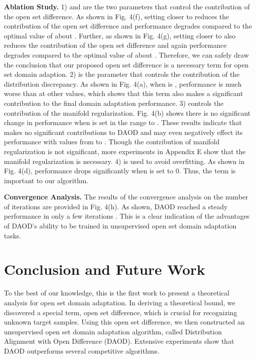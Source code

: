 \documentclass[journal]{IEEEtran}
\begin{document}
{\textbf{Ablation Study.} } 
1)  and  are the two parameters that control the contribution of the open set difference. As shown in Fig. 4(f), setting  closer to  reduces the contribution of the open set difference and performance degrades compared to the optimal value of about . Further, as shown in Fig. 4(g), setting  closer to  also reduces the contribution of the open set difference and again performance degrades compared to the optimal value of about . Therefore, we can safely draw the conclusion that our proposed open set difference is a necessary term for open set domain adaption. 2)  is the parameter that controls the contribution of the distribution discrepancy. As shown in Fig. 4(a), when  is , performance is much worse than at other values, which shows that this term also makes a significant contribution to the final domain adaptation performance. 3) { controls the contribution of the manifold regularization. Fig. 4(b) shows there is no significant change in performance when  is set in the range  to . These results indicate that  makes no significant  contributions to DAOD and may even negatively effect its performance with values from  to . { Though the contribution of  manifold regularization is not significant,  more experiments in Appendix E show that the manifold regularization is necessary}}. 4)  is used to avoid overfitting. As shown in Fig. 4(d), performance drops significantly when  is set to 0. Thus, the term  is important to our algorithm.


\textbf{Convergence Analysis.}  The results of the convergence analysis on the number of iterations  are provided in Fig. 4(h). As shown, DAOD reached a steady performance in only a few iterations . This is a clear indication of the advantages of DAOD's ability to be trained in unsupervised open set domain adaptation tasks. 




















\section{Conclusion and Future Work }
To the best of our knowledge, this is the first work to present a theoretical analysis for open set domain adaptation. In deriving a theoretical bound, we discovered a special term, open set difference, which is crucial for recognizing unknown target samples. Using this open set difference, we then constructed an unsupervised open set domain adaptation algorithm, called Distribution Alignment with Open Difference (DAOD). Extensive experiments show that DAOD outperforms several competitive algorithms.
\end{document}
